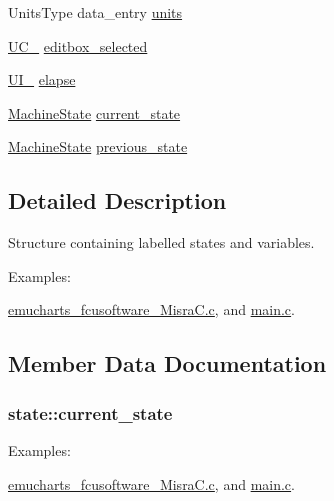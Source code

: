\begin{DoxyCompactItemize}
Units\+Type data\+\_\+entry \hyperlink{structstate_a432520cd6c29e82918b25bc99b0f1e9f}{units}
\item 
\hyperlink{_android__emucharts__fcusoftware___misra_c_8h_a39890fc8a4a6975a2740fb6b03da879d}{U\+C\+\_} \hyperlink{structstate_a01594636777fc241d60eeb6129b9ac4a}{editbox\+\_\+selected}
\item 
\hyperlink{_android__emucharts__fcusoftware___misra_c_8h_ad6a43be0be014a4a15c9ed13b9f0b3b6}{U\+I\+\_} \hyperlink{structstate_ae0c79ae121fc470f945cc03b29c2ab0b}{elapse}
\item 
\hyperlink{_android__emucharts__fcusoftware___misra_c_8h_a80b08f71210afe16038e904a656ed9eb}{Machine\+State} \hyperlink{structstate_a1275dae91d699a4d9330ad05e5c43bdf}{current\+\_\+state}
\item 
\hyperlink{_android__emucharts__fcusoftware___misra_c_8h_a80b08f71210afe16038e904a656ed9eb}{Machine\+State} \hyperlink{structstate_a5c3872ddbefc0dd4f0a5e8a6f8dfe9d1}{previous\+\_\+state}
\end{DoxyCompactItemize}


\subsection{Detailed Description}
Structure containing labelled states and variables. \begin{Desc}
\item[Examples\+: ]\par
\hyperlink{emucharts_fcusoftware__misra_c_8c-example}{emucharts\+\_\+fcusoftware\+\_\+\+Misra\+C.\+c}, and \hyperlink{main_8c-example}{main.\+c}.\end{Desc}


\subsection{Member Data Documentation}
\subsubsection[{\texorpdfstring{current\+\_\+state}{current_state}}]{ state\+::current\+\_\+state}\hypertarget{structstate_a1275dae91d699a4d9330ad05e5c43bdf}{}\label{structstate_a1275dae91d699a4d9330ad05e5c43bdf}
\begin{Desc}
\item[Examples\+: ]\par
\hyperlink{emucharts_fcusoftware__misra_c_8c-example}{emucharts\+\_\+fcusoftware\+\_\+\+Misra\+C.\+c}, and \hyperlink{main_8c-example}{main.\+c}.\end{Desc}

